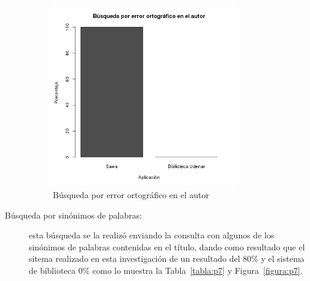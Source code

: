 \begin{description}
   \begin{figure}[!ht]
\begin{center}
\includegraphics[width=8cm]{pictures/p6.png}
\end{center}
\caption{Búsqueda por error ortográfico en el autor} \label{figura:p6}
\end{figure}

\newpage
 \item [Búsqueda por sinónimos de palabras:] esta búsqueda se la realizó enviando la consulta con algunos de los
 sinónimos de palabras contenidas en el título,  dando como resultado que el sitema realizado
 en esta investigación de un resultado del 80\% y el sistema de biblioteca 0\% como lo muestra la Tabla~\ref{tabla:p7} y Figura~\ref{figura:p7}.
 
 \begin{center}
\begin{table}[!ht]
\caption{Búsqueda por sinónimos de palabras}  \label{tabla:p7}
\end{table}
\end{center}
 

\end{description}
